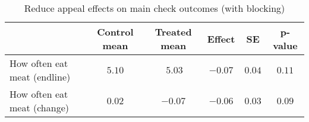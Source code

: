 \begin{table*}[ht]
\caption{Reduce appeal effects on main check outcomes (with blocking)\label{round}} 
\begin{center}
\begin{tabular}{lccccc}
\hline\hline
\multicolumn{1}{l}{}&\multicolumn{1}{c}{Control mean}&\multicolumn{1}{c}{Treated mean}&\multicolumn{1}{c}{Effect}&\multicolumn{1}{c}{SE}&\multicolumn{1}{c}{p-value}\tabularnewline
\hline
How often eat meat (endline)&$5.10$&$~5.03$&$-0.07$&$0.04$&$0.11$\tabularnewline
How often eat meat (change)&$0.02$&$-0.07$&$-0.06$&$0.03$&$0.09$\tabularnewline
\hline
\end{tabular}\end{center}

\end{table*}
